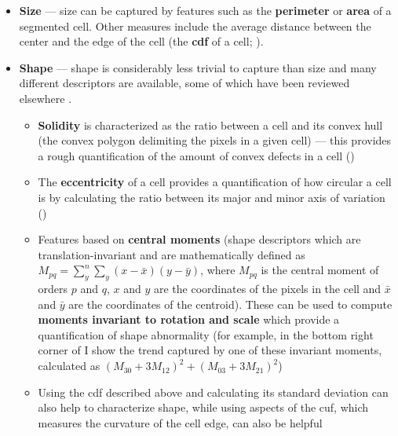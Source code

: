 \begin{itemize}
    \item \textbf{Size} --- size can be captured by features such as the \textbf{perimeter} or \textbf{area} of a segmented cell. Other measures include the average distance between the center and the edge of the cell (the \textbf{\ac{cdf}} of a cell; ).
    \item \textbf{Shape} --- shape is considerably less trivial to capture than size and many different descriptors are available, some of which have been reviewed elsewhere \cite{Mingqiang2008-wv}. 
    \begin{itemize}
        \item \textbf{Solidity} is characterized as the ratio between a cell and its convex hull (the convex polygon delimiting the pixels in a given cell) --- this provides a rough quantification of the amount of convex defects in a cell ()
        \item The \textbf{eccentricity} of a cell provides a quantification of how circular a cell is by calculating the ratio between its major and minor axis of variation ()
        \item Features based on \textbf{central moments} (shape descriptors which are translation-invariant and are mathematically defined as $M_{pq} = \sum_y^n\sum_y(x-\bar{x})(y-\bar{y})$, where $M_{pq}$ is the central moment of orders $p$ and $q$, $x$ and $y$ are the coordinates of the pixels in the cell and $\bar{x}$ and $\bar{y}$ are the coordinates of the centroid). These can be used to compute \textbf{moments invariant to rotation and scale} which provide a quantification of shape abnormality \cite{Mingqiang2008-wv} (for example, in the bottom right corner of  I show the trend captured by one of these invariant moments, calculated as $(M_{30} + 3 M_{12})^2 + (M_{03} + 3 M_{21})^2$)
        \item Using the \ac{cdf} described above and calculating its standard deviation can also help to characterize shape, while using aspects of the \ac{cuf}, which measures the curvature of the cell edge, can also be helpful

\end{itemize}
\end{itemize}
